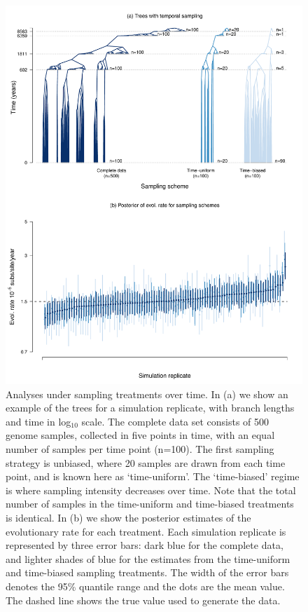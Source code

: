 \documentclass[11pt]{article}
\begin{document}
\begin{figure}[H]
	\begin{center}
		\includegraphics[scale=0.5, angle=0]{sampling_bias_summary_trees_rates.pdf}
		\caption{Analyses under sampling treatments over time. In (a) we show an example of the trees for a simulation replicate, with branch lengths and time in log$_{10}$ scale. The complete data set consists of 500 genome samples, collected in five points in time, with an equal number of samples per time point (n=100). The first sampling strategy is unbiased, where 20 samples are drawn from each time point, and is known here as `time-uniform'. The `time-biased' regime is where sampling intensity decreases over time. Note that the total number of samples in the time-uniform and time-biased treatments is identical. In (b) we show the posterior estimates of the evolutionary rate for each treatment. Each simulation replicate is represented by three error bars: dark blue for the complete data, and lighter shades of blue for the estimates from the time-uniform and time-biased sampling treatments. The width of the error bars denotes the 95\% quantile range and the dots are the mean value. The dashed line shows the true value used to generate the data.}
		\label{figure:Fig4}
	\end{center}
\end{figure}
\end{document}

